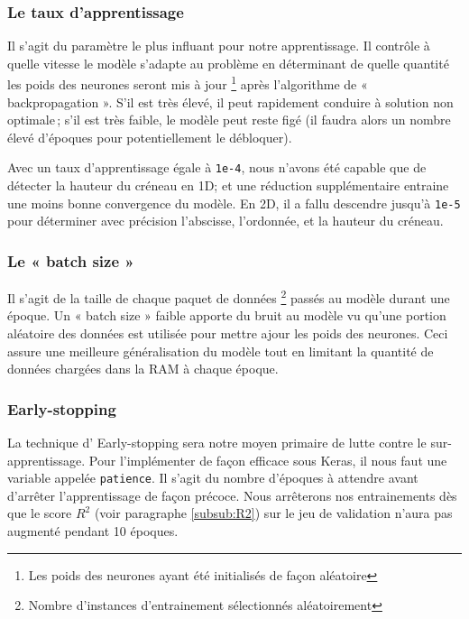 \subsubsection{Le taux d'apprentissage}
Il s'agit du paramètre le plus influant pour notre apprentissage. Il contrôle à quelle vitesse le modèle s'adapte au problème en déterminant de quelle quantité les poids des neurones seront mis à jour \footnote{Les poids des neurones ayant été initialisés de façon aléatoire} après l'algorithme de « backpropagation ». S'il est très élevé, il peut rapidement conduire à solution non optimale ; s'il est très faible, le modèle peut reste figé (il faudra alors un nombre élevé d'époques pour potentiellement le débloquer).

Avec un taux d'apprentissage égale à \verb|1e-4|, nous n'avons été capable que de détecter la hauteur du créneau en 1D; et une réduction supplémentaire entraine une moins bonne convergence du modèle. En 2D, il a fallu descendre jusqu'à \verb|1e-5| pour déterminer avec précision l'abscisse, l'ordonnée, et la hauteur du créneau.

\subsubsection{Le « batch size »}
Il s'agit de la taille de chaque paquet de données \footnote{Nombre d'instances d'entrainement sélectionnés aléatoirement} passés au modèle durant une époque. Un « batch size » faible apporte du bruit au modèle vu qu'une portion aléatoire des données est utilisée pour mettre ajour les poids des neurones. Ceci assure une meilleure généralisation du modèle tout en limitant la quantité de données chargées dans la RAM à chaque époque.

% 
% 

\subsubsection{Early-stopping}
La technique d' Early-stopping sera notre moyen primaire de lutte contre le sur-apprentissage. Pour l'implémenter de façon efficace sous Keras, il nous faut une variable appelée \verb|patience|. Il s'agit du nombre d'époques à attendre avant d'arrêter l'apprentissage de façon précoce. Nous arrêterons nos entrainements dès que le score $R^2$ (voir paragraphe \ref{subsub:R2}) sur le jeu de validation n'aura pas augmenté pendant 10 époques. 

